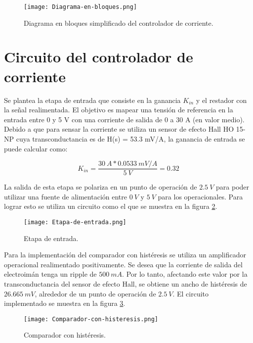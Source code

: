 \begin{figure}[H]
	\centering
	\texttt{[image: Diagrama-en-bloques.png]}
	\caption{Diagrama en bloques simplificado del controlador de corriente.}
	\label{fig:img_diag-en-bloques}
\end{figure}

\section{Circuito del controlador de corriente}

\noindent Se plantea la etapa de entrada que consiste en la ganancia $K_{in}$ y el restador con la señal realimentada. El objetivo es mapear una tensión de referencia en la entrada entre 0 y 5 V con una corriente de salida de 0 a 30 A (en valor medio).  Debido a que para sensar la corriente se utiliza un sensor de efecto Hall HO 15-NP cuya transconductancia es de H(s) = 53.3 mV/A, la ganancia de entrada se puede calcular como:

\begin{equation}
	K_{in}=\frac{30\:A*0.0533\:mV/A}{5\:V}=0.32 
\end{equation}


La salida de esta etapa se polariza en un punto de operación de $2.5\:V$ para poder utilizar una fuente de alimentación entre $0\:V$ y $5\:V$ para los operacionales. Para lograr esto se utiliza un circuito como el que se muestra en la figura \ref{fig:img_etapa-de-entrada}.


\begin{figure}[H]
	\centering
	\texttt{[image: Etapa-de-entrada.png]}
	\caption{Etapa de entrada.}
	\label{fig:img_etapa-de-entrada}
\end{figure}

Para la implementación del comparador con histéresis se utiliza un amplificador operacional realimentado positivamente. Se desea que la corriente de salida del electroimán tenga un ripple de $500\:mA$. Por lo tanto, afectando este valor por la transconductancia del sensor de efecto Hall, se obtiene un ancho de histéresis de $26.665\:mV$, alrededor de un punto de operación de $2.5\:V$. El circuito implementado se muestra en la figura \ref{fig:img_comp-con-hist}.

\begin{figure}[H]
	\centering
	\texttt{[image: Comparador-con-histeresis.png]}
	\caption{Comparador con histéresis.}
	\label{fig:img_comp-con-hist}
\end{figure}

